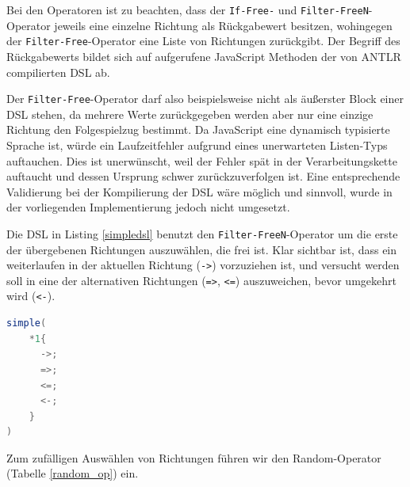 \documentclass[conference]{IEEEtran}
\begin{document}
Bei den Operatoren ist zu beachten, dass der \texttt{If-Free-} und \texttt{Filter-FreeN}-Operator jeweils eine einzelne Richtung als Rückgabewert besitzen, wohingegen der \texttt{Filter-Free}-Operator eine Liste von Richtungen zurückgibt. Der Begriff des Rückgabewerts bildet sich auf aufgerufene JavaScript Methoden der von ANTLR compilierten DSL ab.

Der \texttt{Filter-Free}-Operator darf also beispielsweise nicht als äußerster Block einer DSL stehen, da mehrere Werte zurückgegeben werden aber nur eine einzige Richtung den Folgespielzug bestimmt. Da JavaScript eine dynamisch typisierte Sprache ist, würde ein Laufzeitfehler aufgrund eines unerwarteten Listen-Typs auftauchen. Dies ist unerwünscht, weil der Fehler spät in der Verarbeitungskette auftaucht und dessen Ursprung schwer zurückzuverfolgen ist. Eine entsprechende Validierung bei der Kompilierung der DSL wäre möglich und sinnvoll, wurde in der vorliegenden Implementierung jedoch nicht umgesetzt.

Die DSL in Listing \ref{simpledsl} benutzt den \texttt{Filter-FreeN}-Operator um die erste der übergebenen Richtungen auszuwählen, die frei ist. Klar sichtbar ist, dass ein weiterlaufen in der aktuellen Richtung (\texttt{->}) vorzuziehen ist, und versucht werden soll in eine der alternativen Richtungen (\texttt{=>}, \texttt{<=}) auszuweichen, bevor umgekehrt wird (\texttt{<-}).


\begin{lstlisting}[language=Java, captionpos=b, caption=AI DSL mit F\texttt{Filter-FreeN}-Operator, label=simpledsl]
simple(
    *1{
      ->;
      =>;
      <=;
      <-;
    }
)
\end{lstlisting}

Zum zufälligen Auswählen von Richtungen führen wir den Random-Operator (Tabelle \ref{random_op}) ein.
\end{document}
